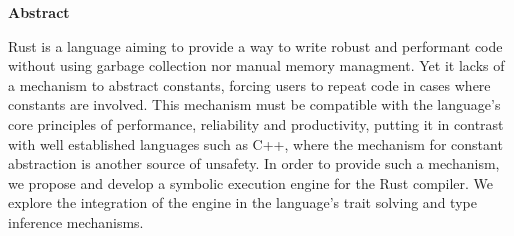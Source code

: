 
\clearemptydoublepage
{}
{}

\vspace*{2cm}
\begin{center}
{\Large \textbf{Abstract}}
\end{center}
\vspace{1cm}

Rust is a language aiming to provide a way to write robust and performant code without using garbage collection nor manual memory managment. Yet it lacks of a mechanism to abstract constants, forcing users to repeat code in cases where constants are involved. This mechanism must be compatible with the language's core principles of performance, reliability and productivity, putting it in contrast with well established languages such as C++, where the mechanism for constant abstraction is another source of unsafety. In order to provide such a mechanism, we propose and develop a symbolic execution engine for the Rust compiler. We explore the integration of the engine in the language's trait solving and type inference mechanisms.

